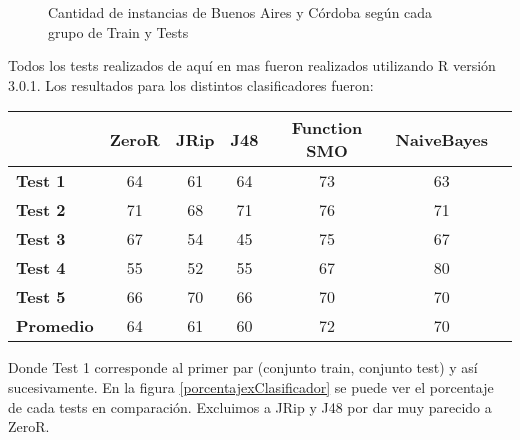 \begin{figure}[H]
\centering
\pgfplotsset{width=10cm, height=4cm, compat=1.9}
\caption{Cantidad de instancias de Buenos Aires y Córdoba según cada grupo de Train y Tests}
\label{TestsInstances}
\end{figure}

Todos los tests realizados de aquí en mas fueron realizados utilizando R versión 3.0.1. Los resultados para los distintos clasificadores fueron:

\begin{table}[H]
\centering
\begin{tabular}{|l|c|c|c|c|c|c|}
\hline
\textbf{}  & \textbf{ZeroR} & \textbf{JRip} & \textbf{J48} & \textbf{Function SMO} & \textbf{NaiveBayes} \\ \hline
\textbf{Test 1}  & 64 & 61 & 64 & 73 & 63 \\ \hline
\textbf{Test 2}  & 71 & 68 & 71 & 76 & 71 \\ \hline
\textbf{Test 3}  & 67 & 54 & 45 & 75 & 67 \\ \hline
\textbf{Test 4}  & 55 & 52 & 55 & 67 & 80 \\ \hline
\textbf{Test 5}  & 66 & 70 & 66 & 70 & 70 \\ \hline
\hline \hline
\textbf{Promedio} & 64 & 61 & 60 & 72 & 70 \\ \hline
\end{tabular}
\end{table}

Donde Test 1 corresponde al primer par (conjunto train, conjunto test) y así sucesivamente. En la figura \ref{porcentajexClasificador} se puede ver el porcentaje de cada tests en comparación. Excluimos a JRip y J48 por dar muy parecido a ZeroR.

